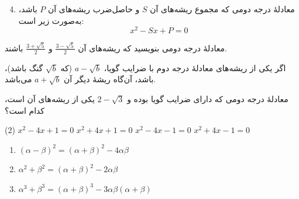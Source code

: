 \vspace{0.4\baselineskip}

\begin{enumerate}[label=\arabic*]
\setcounter{enumi}{3}
\item معادلۀ درجه دومی که مجموع ریشه‌های آن \(S\) و حاصل‌ضرب ریشه‌های آن \(P\) باشد، به‌صورت زیر است:
$$x^2-Sx+P=0$$
\end{enumerate}

\begin{example}
معادلۀ درجه دومی بنویسید که ریشه‌های آن
$\frac{3-\sqrt{5}}{2}$
و
$\frac{3+\sqrt{5}}{2}$
باشند.
\end{example}

\vspace{0.4\baselineskip}

\begin{remark}
اگر یکی از ریشه‌های معادلۀ درجه دوم با ضرایب گویا،
\(a-\sqrt{b}\) (که \(\sqrt{b}\) گنگ باشد)، باشد،
آن‌گاه ریشۀ دیگر آن \(a+\sqrt{b}\) می‌باشد.
\end{remark}

\begin{example}
معادلۀ درجه دومی که دارای ضرایب گویا بوده و
\(2-\sqrt{3}\) یکی از ریشه‌های آن است، کدام است؟

\begin{tasks}(2)
    \task \(x^2-4x+1=0\)
    \task \(x^2+4x+1=0\)
    \task \(x^2-4x-1=0\)
    \task \(x^2+4x-1=0\)
\end{tasks}
\end{example}

\vspace{0.3\baselineskip}

\begin{remark}[توجه]
\begin{LTR}
\begin{enumerate}
    \item $(\alpha-\beta)^2 = (\alpha+\beta)^2-4\alpha\beta$
    \item $\alpha^2+\beta^2 = (\alpha+\beta)^2-2\alpha\beta$
    \item $\alpha^3+\beta^3 = (\alpha+\beta)^3-3\alpha\beta(\alpha+\beta)$
\end{enumerate}
\end{LTR}
\end{remark}

